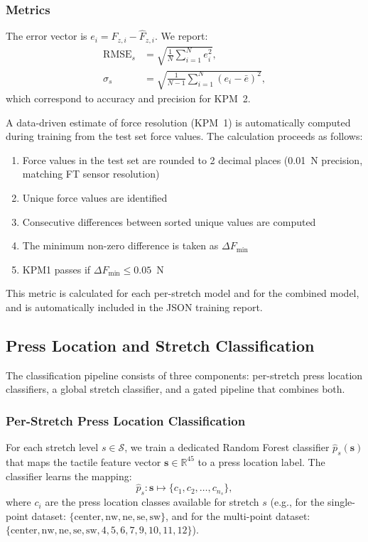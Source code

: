 \documentclass[11pt,a4paper]{article}
\begin{document}
\subsubsection{Metrics}
The error vector is \(e_i = F_{z,i} - \hat{F}_{z,i}\). We report:
\begin{align}
    \text{RMSE}_s &= \sqrt{\frac{1}{N} \sum_{i=1}^{N} e_i^2}, \\
    \sigma_s &= \sqrt{\frac{1}{N-1} \sum_{i=1}^{N} (e_i - \bar{e})^2},
\end{align}
which correspond to accuracy and precision for KPM~2. 

A data-driven estimate of force resolution (KPM~1) is automatically computed during training from the test set force values. The calculation proceeds as follows:
\begin{enumerate}[leftmargin=1.5em]
    \item Force values in the test set are rounded to 2 decimal places (0.01~N precision, matching FT sensor resolution)
    \item Unique force values are identified
    \item Consecutive differences between sorted unique values are computed
    \item The minimum non-zero difference is taken as \(\Delta F_{\text{min}}\)
    \item KPM1 passes if \(\Delta F_{\text{min}} \leq 0.05\)~N
\end{enumerate}
This metric is calculated for each per-stretch model and for the combined model, and is automatically included in the JSON training report.

\subsection{Press Location and Stretch Classification}
\label{sec:classification-models}

The classification pipeline consists of three components: per-stretch press location classifiers,
a global stretch classifier, and a gated pipeline that combines both.

\subsubsection{Per-Stretch Press Location Classification}
For each stretch level \(s \in \mathcal{S}\), we train a dedicated Random Forest classifier
\(\hat{p}_s(\mathbf{s})\) that maps the tactile feature vector \(\mathbf{s} \in \mathbb{R}^{45}\) to a press location label. The classifier learns the
mapping:
\[
    \hat{p}_s: \mathbf{s} \mapsto \{c_1, c_2, \ldots, c_{n_s}\},
\]
where \(c_i\) are the press location classes available for stretch \(s\) (e.g., for the single-point
dataset: \(\{\text{center}, \text{nw}, \text{ne}, \text{se}, \text{sw}\}\), and for the multi-point dataset:
\(\{\text{center}, \text{nw}, \text{ne}, \text{se}, \text{sw}, 4, 5, 6, 7, 9, 10, 11, 12\}\)).
\end{document}
